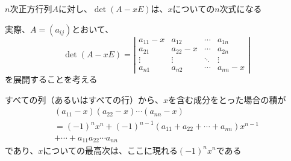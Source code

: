 \documentclass[../../../topic_linear-algebra]{subfiles}
\begin{document}
\sectionline

$n$次正方行列$A$に対し、$\det(A-xE)$は、$x$についての$n$次式になる

\br

実際、$A = (a_{ij})$とおいて、
\begin{equation*}
  \det(A - xE ) = \left|\begin{matrix}
    a_{11} - x & a_{12}     & \cdots & a_{1n}     \\
    a_{21}     & a_{22} - x & \cdots & a_{2n}     \\
    \vdots     & \vdots     & \ddots & \vdots     \\
    a_{n1}     & a_{n2}     & \cdots & a_{nn} - x
  \end{matrix}\right|
\end{equation*}
を展開することを考える

すべての列（あるいはすべての行）から、$x$を含む成分をとった場合の積が
\begin{multline*}
  (a_{11} - x)(a_{22} - x) \cdots (a_{nn} - x) \\
  = (-1)^n x^n + (-1)^{n-1}(a_{11} + a_{22} + \cdots + a_{nn})x^{n-1} \\+
  \cdots + a_{11}a_{22}\cdots a_{nn}
\end{multline*}
であり、$x$についての最高次は、ここに現れる$(-1)^n x^n$である

\end{document}
